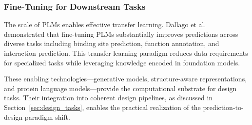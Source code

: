 \subsubsection{Fine-Tuning for Downstream Tasks}

The scale of PLMs enables effective transfer learning. Dallago et al.~\cite{dallago2024plmfinetune} demonstrated that fine-tuning PLMs substantially improves predictions across diverse tasks including binding site prediction, function annotation, and interaction prediction. This transfer learning paradigm reduces data requirements for specialized tasks while leveraging knowledge encoded in foundation models.

\vspace{1em}
\noindent
These enabling technologies---generative models, structure-aware representations, and protein language models---provide the computational substrate for design tasks. Their integration into coherent design pipelines, as discussed in Section~\ref{sec:design_tasks}, enables the practical realization of the prediction-to-design paradigm shift.
